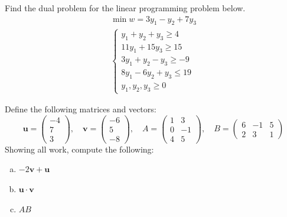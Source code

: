 \documentclass[12pt,letterpaper]{exam}
\begin{document}
\examtitle
{} 
\scores
\bottomline
\newpage

\begin{questions}

\newpage
\question[10] Find the dual problem for the linear programming problem below. 
	\[
	\begin{gathered}
	\min w= 3y_1 - y_2 + 7y_3  \\
	\begin{cases}
	y_1 + y_2 + y_3 \geq 4 \\
	11y_1 + 15y_3 \geq 15 \\
	3y_1 + y_2 - y_3 \geq -9 \\
	8y_1 - 6y_2 + y_3 \leq 19 \\
	y_1, y_2, y_3 \geq 0
	\end{cases}
	\end{gathered}
	\]



\newpage
\question[10] Define the following matrices and vectors:
	\[
	\mathbf{u}= \begin{pmatrix} -4 \\ 7 \\ 3 \end{pmatrix}, \quad 
	\mathbf{v}= \begin{pmatrix} -6 \\ 5 \\ -8 \end{pmatrix}, \quad
	A= \begin{pmatrix} 1 & 3 \\ 0 & -1 \\ 4 & 5 \end{pmatrix}, \quad 
	B= \begin{pmatrix} 6 & -1 & 5 \\ 2 & 3 & 1 \end{pmatrix}
	\]
Showing all work, compute the following:
	\begin{enumerate}[(a)]
	\item $-2\mathbf{v} + \mathbf{u}$
	\item $\mathbf{u} \cdot \mathbf{v}$
	\item $AB$
	\end{enumerate}




\end{questions}
\end{document}
